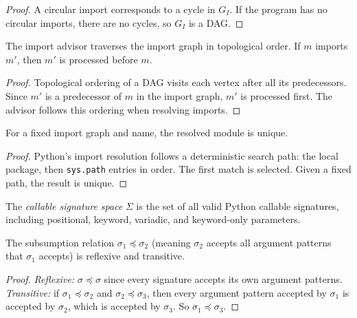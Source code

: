 \documentclass[11pt]{article}
\begin{document}
\begin{proof}
A circular import corresponds to a cycle in $G_I$.  If the program
has no circular imports, there are no cycles, so $G_I$ is a DAG.
\end{proof}

\begin{lemma}
\label{lem:import-dag-respect}
The import advisor traverses the import graph in topological order.
If $m$ imports $m'$, then $m'$ is processed before $m$.
\end{lemma}

\begin{proof}
Topological ordering of a DAG visits each vertex after all its
predecessors.  Since $m'$ is a predecessor of $m$ in the import
graph, $m'$ is processed first.  The advisor follows this ordering
when resolving imports.
\end{proof}

\begin{lemma}
\label{lem:import-determ}
For a fixed import graph and name, the resolved module is unique.
\end{lemma}

\begin{proof}
Python's import resolution follows a deterministic search path:
the local package, then \texttt{sys.path} entries in order.  The
first match is selected.  Given a fixed path, the result is unique.
\end{proof}

\begin{definition}
\label{def:callable-sig-space}
The \emph{callable signature space} $\Sigma$ is the set of all
valid Python callable signatures, including positional, keyword,
variadic, and keyword-only parameters.
\end{definition}

\begin{lemma}
\label{lem:sig-preorder}
The subsumption relation $\sigma_1 \preceq \sigma_2$ (meaning
$\sigma_2$ accepts all argument patterns that $\sigma_1$ accepts)
is reflexive and transitive.
\end{lemma}

\begin{proof}
\emph{Reflexive:} $\sigma \preceq \sigma$ since every signature
accepts its own argument patterns.
\emph{Transitive:} if $\sigma_1 \preceq \sigma_2$ and
$\sigma_2 \preceq \sigma_3$, then every argument pattern
accepted by $\sigma_1$ is accepted by $\sigma_2$, which
is accepted by $\sigma_3$.  So $\sigma_1 \preceq \sigma_3$.
\end{proof}
\end{document}
